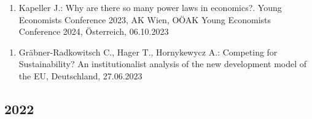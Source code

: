 \begin{enumerate}
	\item Kapeller J.: Why are there so many power laws in economics?. Young Economists Conference 2023, AK Wien, OÖAK Young Economists Conference 2024, Österreich, 06.10.2023
\end{enumerate}

\begin{enumerate}
	\item Gräbner-Radkowitsch C., Hager T., Hornykewycz A.: Competing for Sustainability? An institutionalist analysis of the new development model of the EU, Deutschland, 27.06.2023
\end{enumerate}
\subsection*{2022}

